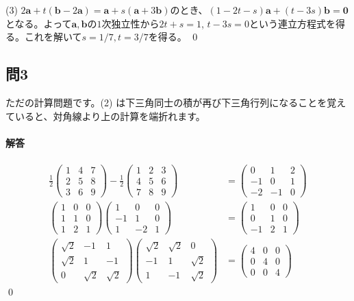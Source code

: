 \noindent (3) $2\bm{a} + t(\bm{b} - 2\bm{a}) = \bm{a} + s(\bm{a} + 3\bm{b})$のとき、$(1 - 2t - s)\bm{a} + (t - 3s)\bm{b} = \bm{0}$となる。よって$\bm{a}, \bm{b}$の$1$次独立性から$2t + s = 1$, $t - 3s = 0$という連立方程式を得る。これを解いて$s = 1/7, t = 3/7$を得る。 \qed

\subsection{問3} ただの計算問題です。(2) は下三角同士の積が再び下三角行列になることを覚えていると、対角線より上の計算を端折れます。

\paragraph{解答}

\begin{align*}
\frac{1}{2}
\begin{pmatrix}
1 & 4 & 7 \\
2 & 5 & 8 \\
3 & 6 & 9
\end{pmatrix}
- \frac{1}{2}
\begin{pmatrix}
1 & 2 & 3 \\
4 & 5 & 6 \\
7 & 8 & 9
\end{pmatrix}
&=
\begin{pmatrix}
0 & 1 & 2 \\
-1 & 0 & 1 \\
-2 & -1 & 0
\end{pmatrix} \\
\begin{pmatrix}
1 & 0 & 0 \\
1 & 1 & 0 \\
1 & 2 & 1
\end{pmatrix}
\begin{pmatrix}
1 & 0 & 0 \\
-1 & 1 & 0 \\
1 & -2 & 1
\end{pmatrix}
&=
\begin{pmatrix}
1 & 0 & 0 \\
0 & 1 & 0 \\
-1 & 2 & 1
\end{pmatrix} \\
\begin{pmatrix}
\sqrt{2} & -1 & 1 \\
\sqrt{2} & 1 & -1 \\
0 & \sqrt{2} & \sqrt{2}
\end{pmatrix}
\begin{pmatrix}
\sqrt{2} & \sqrt{2} & 0 \\
-1 & 1 & \sqrt{2} \\
1 & -1 & \sqrt{2}
\end{pmatrix}
&= 
\begin{pmatrix}
4 & 0 & 0 \\
0 & 4 & 0 \\
0 & 0 & 4
\end{pmatrix}
\end{align*}
\qed

